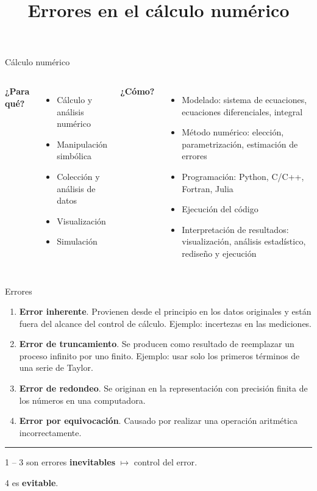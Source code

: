 \documentclass[9pt, aspectratio=169]{beamer}
\title{Errores en el cálculo numérico}
\subtitle{}
\begin{document}
\maketitle

\begin{frame}{Cálculo numérico}
  \begin{columns}[t]
    \cx
    \textbf{¿Para qué?}

    \begin{itemize}
      \item  Cálculo y análisis numérico
      \item Manipulación simbólica
      \item Colección y análisis de datos
      \item Visualización
      \item Simulación
    \end{itemize}
    \pause

    \cx
    \textbf{¿Cómo?}

    \begin{itemize}
      \item Modelado: sistema de ecuaciones, ecuaciones diferenciales, integral
      \item Método numérico: elección, parametrización, \alert{estimación de errores}
      \item Programación: \alert{Python}, C/C++, Fortran, Julia
      \item Ejecución del código
      \item Interpretación de resultados: visualización, análisis estadístico, rediseño y ejecución
    \end{itemize}
  \end{columns}
\end{frame}

\begin{frame}{Errores}
  \begin{enumerate}
    \item \textbf{Error inherente}. Provienen desde el principio en los datos originales y están fuera del alcance del control de cálculo. Ejemplo: incertezas en las mediciones. \medskip
    \item \textbf{Error de truncamiento}. Se producen como resultado de reemplazar un proceso infinito por uno finito. Ejemplo: usar solo los primeros términos de una serie de Taylor. \medskip
    \item \textbf{Error de redondeo}. Se originan en la representación con precisión finita de los números en una computadora. \medskip
    \item \textbf{Error por equivocación}. Causado por realizar una operación aritmética incorrectamente.
  \end{enumerate}

  \par\noindent\rule{\textwidth}{0.5pt} \pause

  \begin{center}
    1 -- 3 son errores \textbf{inevitables} $\mapsto$ \alert{control del error}.

    4 es \textbf{evitable}.
  \end{center}
\end{frame}
\end{document}
